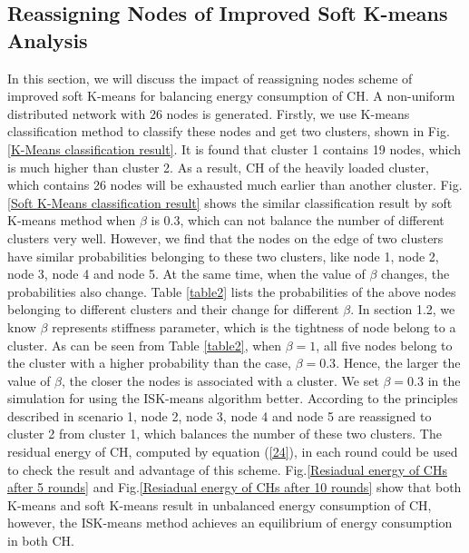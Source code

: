 \documentclass[journal,twoside,web]{ieeecolor}
\begin{document}
\subsection{Reassigning Nodes of Improved Soft K-means Analysis}
In this section, we will discuss the impact of reassigning nodes scheme of improved soft K-means for balancing energy consumption of CH. A non-uniform distributed network with 26 nodes is generated. Firstly, we use K-means classification method to classify these nodes and get two clusters, shown in Fig.\ref{K-Means classification result}. It is found that cluster 1 contains 19 nodes, which is much higher than cluster 2. As a result, CH of the heavily loaded cluster, which contains 26 nodes will be exhausted much earlier than another cluster. Fig.\ref{Soft K-Means classification result} shows the similar classification result by soft K-means method when $\beta$ is 0.3, which can not balance the number of different clusters very well. However, we find that the nodes on the edge of two clusters have similar probabilities belonging to these two clusters, like node 1, node 2, node 3, node 4 and node 5. At the same time, when the value of $\beta$ changes, the probabilities also change. Table \ref{table2} lists the probabilities of the above nodes belonging to different clusters and their change for different $\beta$. In section 1.2, we know $\beta$ represents stiffness parameter, which is the tightness of node belong to a cluster. As can be seen from Table \ref{table2}, 
when $\beta = 1$, all five nodes belong to the cluster with a higher probability than the case, $\beta = 0.3$. Hence, the larger the value of $\beta$, the closer the nodes is associated with a cluster. We set $\beta= 0.3$ in the simulation for using the ISK-means algorithm better. According to the principles described in scenario 1, node 2, node 3, node 4 and node 5 are reassigned to cluster 2 from cluster 1, which balances the number of these two clusters. The residual energy of CH, computed by equation (\ref{24}), in each round could be used to check the result and advantage of this scheme. Fig.\ref{Resiadual energy of CHs after 5 rounds} and Fig.\ref{Resiadual energy of CHs after 10 rounds} show that both K-means and soft K-means result in unbalanced energy consumption of CH, however, the ISK-means method achieves an equilibrium of energy consumption in both CH.
\end{document}
